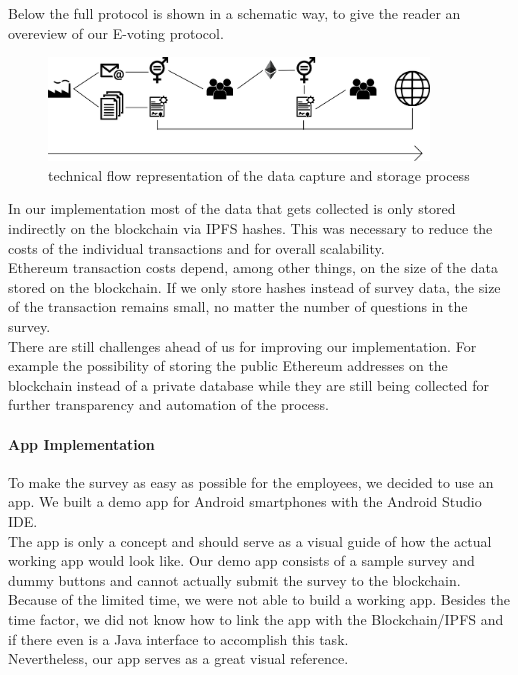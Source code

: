 Below the full protocol is shown in a schematic way, to give the reader an overeview of our E-voting protocol.
\begin{figure}[H]
	\includegraphics[width=0.9\textwidth]{Bilder/Survey_Protocol_preview_2}
	\caption{technical flow representation of the data capture and storage process}
	\label{technical_flow_representation}
\end{figure}

In our implementation most of the data that gets collected is only stored indirectly on the blockchain via IPFS hashes. This was necessary to reduce the costs of the individual transactions and for overall scalability.\\
Ethereum transaction costs depend, among other things, on the size of the data stored on the blockchain. If we only store hashes instead of survey data, the size of the transaction remains small, no matter the number of questions in the survey.\\

There are still challenges ahead of us for improving our implementation. For example the possibility of storing the public Ethereum addresses on the blockchain instead of a private database while they are still being collected for further transparency and automation of the process.\\

\paragraph*{App Implementation}
To make the survey as easy as possible for the employees, we decided to use an app. We built a demo app for Android smartphones with the Android Studio IDE.\\
The app is only a concept and should serve as a visual guide of how the actual working app would look like. Our demo app consists of a sample survey and dummy buttons and cannot actually submit the survey to the blockchain.\\
Because of the limited time, we were not able to build a working app. Besides the time factor, we did not know how to link the app with the Blockchain/IPFS and if there even is a Java interface to accomplish this task.\\
Nevertheless, our app serves as a great visual reference.\\

